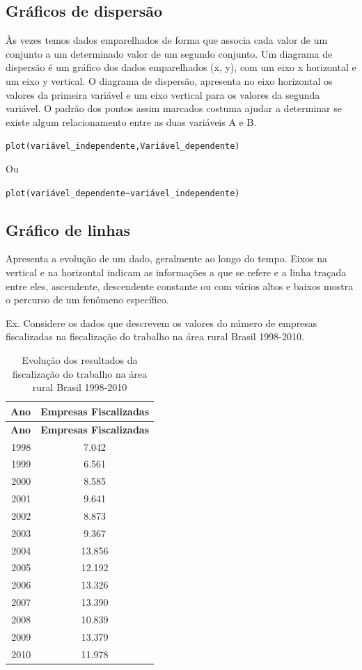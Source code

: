 \documentclass[12pt,brazil,oneside]{book}
\begin{document}
\hypertarget{graficos-de-dispersao}{%
\subsection{Gráficos de dispersão}\label{graficos-de-dispersao}}

Às vezes temos dados emparelhados de forma que associa cada valor de um
conjunto a um determinado valor de um segundo conjunto. Um diagrama de
dispersão é um gráfico dos dados emparelhados (x, y), com um eixo x
horizontal e um eixo y vertical. O diagrama de dispersão, apresenta no
eixo horizontal os valores da primeira variável e um eixo vertical para
os valores da segunda variável. O padrão dos pontos assim marcados
costuma ajudar a determinar se existe algum relacionamento entre as duas
variáveis A e B.

\texttt{plot(variável\_independente,Variável\_dependente)}

Ou

\texttt{plot(variável\_dependente\textasciitilde{}variável\_independente)}

\hypertarget{grafico-de-linhas}{%
\subsection{Gráfico de linhas}\label{grafico-de-linhas}}

Apresenta a evolução de um dado, geralmente ao longo do tempo. Eixos na
vertical e na horizontal indicam as informações a que se refere e a
linha traçada entre eles, ascendente, descendente constante ou com
vários altos e baixos mostra o percurso de um fenômeno específico.

Ex. Considere os dados que descrevem os valores do número de empresas
fiscalizadas na fiscalização do trabalho na área rural Brasil 1998-2010.

\begin{longtable}[]{@{}rc@{}}
\caption{\label{tab:evolres}Evolução dos resultados da fiscalização do
trabalho na área rural Brasil 1998-2010}\tabularnewline
\toprule
\textbf{Ano} & \textbf{Empresas Fiscalizadas}\tabularnewline
\midrule
\endfirsthead
\toprule
\textbf{Ano} & \textbf{Empresas Fiscalizadas}\tabularnewline
\midrule
\endhead
1998 & 7.042\tabularnewline
1999 & 6.561\tabularnewline
2000 & 8.585\tabularnewline
2001 & 9.641\tabularnewline
2002 & 8.873\tabularnewline
2003 & 9.367\tabularnewline
2004 & 13.856\tabularnewline
2005 & 12.192\tabularnewline
2006 & 13.326\tabularnewline
2007 & 13.390\tabularnewline
2008 & 10.839\tabularnewline
2009 & 13.379\tabularnewline
2010 & 11.978\tabularnewline
\bottomrule
\end{longtable}
\end{document}
